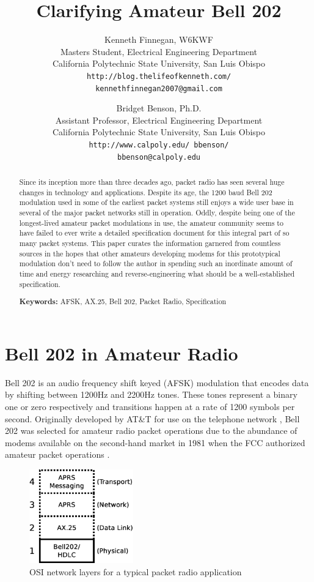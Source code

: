 \documentclass[12pt,letterpaper]{article}
\title{Clarifying Amateur Bell 202}
\author{Kenneth Finnegan, W6KWF\\
\small Masters Student, Electrical Engineering Department\\
\small California Polytechnic State University, San Luis Obispo\\
\small \texttt{http://blog.thelifeofkenneth.com/}\\
\small \texttt{kennethfinnegan2007@gmail.com}\\
\and
Bridget Benson, Ph.D.\\
\small Assistant Professor, Electrical Engineering Department\\
\small California Polytechnic State University, San Luis Obispo\\
\small \texttt{http://www.calpoly.edu/~bbenson/}\\
\small \texttt{bbenson@calpoly.edu}}
\begin{document}
\maketitle

\begin{abstract}
	Since its inception more than three decades ago, 
	packet radio has seen several huge changes in technology
	and applications. 
	Despite its age, the 1200 baud Bell 202 modulation used in some
	of the earliest packet systems still enjoys a wide user base
	in several of the major packet networks still in operation.
	Oddly, despite being one of the longest-lived amateur packet modulations in use,
	the amateur community seems to have failed to ever write a detailed
	specification document for this integral part of so many packet systems.
	This paper curates the information garnered from countless sources
	in the hopes that other amateurs developing modems for 
	this prototypical modulation
	don't need to follow the author in spending such an inordinate amount of
	time and energy researching and reverse-engineering what should be a
	well-established specification.
	
	
	\textbf{Keywords:} AFSK, AX.25, Bell 202, Packet Radio, Specification
\end{abstract}


\section{Bell 202 in Amateur Radio}
\label{sec:bell202history}

Bell 202 is an audio frequency shift keyed (AFSK) modulation that
encodes data by shifting between 1200Hz and 2200Hz tones.
These tones represent a binary one or zero respectively and transitions happen
at a rate of 1200 symbols per second.
Originally developed by AT\&T for use on the telephone network \cite{202tspec},
Bell 202 was selected for amateur radio packet operations due to the abundance
of modems available on the second-hand market in 1981 when the FCC authorized
amateur packet operations \cite{gatewaypacket}.

\begin{figure}
	\centering
	\includegraphics[width=0.4\textwidth]{src/dia/osi_bell202}
	\caption{OSI network layers for a typical packet radio application}
	\label{fig:osibell}
\end{figure}
\end{document}

